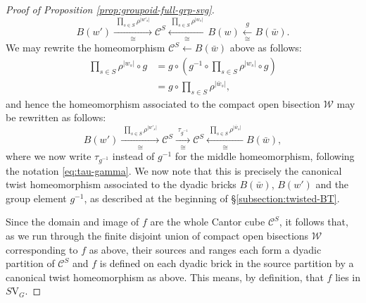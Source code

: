 \documentclass[10pt,a4paper]{amsart}
\numberwithin{equation}{section}
\numberwithin{figure}{section}
\theoremstyle{definition}
\newcommand{\cC}{\mathcal{C}}
\newcommand{\cW}{\mathcal{W}}
\begin{document}
\begin{proof}[Proof of Proposition \ref{prop:groupoid-full-grp-svg}]
\[
B(w') \xrightarrow[\cong]{\; \prod_{s \in S} \rho^{\lvert w'_s \rvert} \;} \cC^S \xleftarrow[\cong]{\; \prod_{s \in S} \rho^{\lvert w_s \rvert} \;} B(w) \xleftarrow[\cong]{\; g \;} B(\bar{w}).
\]
We may rewrite the homeomorphism $\cC^S \leftarrow B(\bar{w})$ above as follows:
\begin{align*}
\prod_{s\in S} \rho^{\lvert w_s \rvert} \circ g &= g \circ \left( g^{-1} \circ \prod_{s\in S} \rho^{\lvert w_s \rvert} \circ g \right) \\
&= g \circ \prod_{s \in S} \rho^{\lvert \bar{w}_s \rvert} ,
\end{align*}
and hence the homeomorphism associated to the compact open bisection $\cW$ may be rewritten as follows:
\[
B(w') \xrightarrow[\cong]{\; \prod_{s \in S} \rho^{\lvert w'_s \rvert} \;} \cC^S \xrightarrow[\cong]{\; \tau_{g^{-1}} \;} \cC^S \xleftarrow[\cong]{\; \prod_{s \in S} \rho^{\lvert \bar{w}_s \rvert} \;} B(\bar{w}),
\]
where we now write $\tau_{g^{-1}}$ instead of $g^{-1}$ for the middle homeomorphism, following the notation \eqref{eq:tau-gamma}. We now note that this is precisely the canonical twist homeomorphism associated to the dyadic bricks $B(\bar{w})$, $B(w')$ and the group element $g^{-1}$, as described at the beginning of \S\ref{subsection:twisted-BT}.

Since the domain and image of $f$ are the whole Cantor cube $\cC^S$, it follows that, as we run through the finite disjoint union of compact open bisections $\cW$ corresponding to $f$ as above, their sources and ranges each form a dyadic partition of $\cC^S$ and $f$ is defined on each dyadic brick in the source partition by a canonical twist homeomorphism as above. This means, by definition, that $f$ lies in $S\mathrm{V}_G$.
\end{proof}
\end{document}
